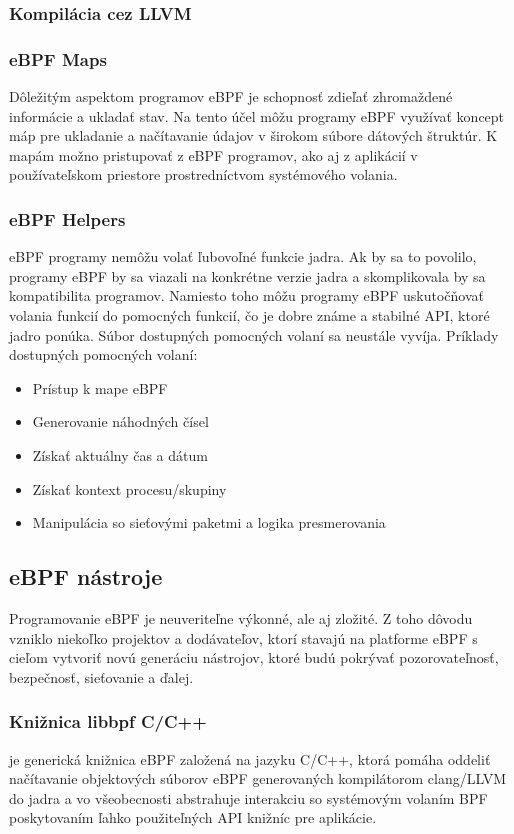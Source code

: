 \subsubsection{Kompilácia cez LLVM}

\subsubsection{eBPF Maps}
Dôležitým aspektom programov eBPF je schopnosť zdieľať zhromaždené informácie a ukladať stav. 
Na tento účel môžu programy eBPF využívať koncept máp pre ukladanie a načítavanie údajov v širokom súbore dátových štruktúr.
K mapám možno pristupovať z eBPF programov, ako aj z aplikácií v používateľskom priestore prostredníctvom systémového volania.

\subsubsection{eBPF Helpers}
eBPF programy nemôžu volať ľubovoľné funkcie jadra. Ak by sa to povolilo, programy eBPF by sa viazali na konkrétne verzie jadra 
a skomplikovala by sa kompatibilita programov. Namiesto toho môžu programy eBPF uskutočňovať volania funkcií do pomocných funkcií, 
čo je dobre známe a stabilné API, ktoré jadro ponúka. Súbor dostupných pomocných volaní sa neustále vyvíja. 
Príklady dostupných pomocných volaní:
\begin{itemize}
\item Prístup k mape eBPF
\item Generovanie náhodných čísel
\item Získať aktuálny čas a dátum
\item Získať kontext procesu/skupiny
\item Manipulácia so sieťovými paketmi a logika presmerovania
\end{itemize}

\subsection{eBPF nástroje}
Programovanie eBPF je neuveriteľne výkonné, ale aj zložité. Z toho dôvodu vzniklo niekoľko projektov a dodávateľov, 
ktorí stavajú na platforme eBPF s cieľom vytvoriť novú generáciu nástrojov, ktoré budú pokrývať pozorovateľnosť, bezpečnosť, sieťovanie a ďalej.

\subsubsection{Knižnica libbpf C/C++}
je generická knižnica eBPF založená na jazyku C/C++, ktorá pomáha oddeliť načítavanie objektových súborov 
eBPF generovaných kompilátorom clang/LLVM do jadra a vo všeobecnosti abstrahuje interakciu so systémovým volaním BPF 
poskytovaním ľahko použiteľných API knižníc pre aplikácie.

